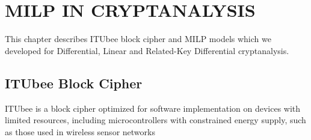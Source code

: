 \chapter{MILP IN CRYPTANALYSIS }\label{ch:milpinCryptanaylsis}
This chapter describes ITUbee block cipher and MILP models which we developed for Differential, Linear and Related-Key Differential cryptanalysis. 

\section{ITUbee Block Cipher}
ITUbee \cite{karakocc2013itubee} is a block cipher optimized for software implementation on devices with limited resources, including microcontrollers with constrained energy supply, such as those used in wireless sensor networks

